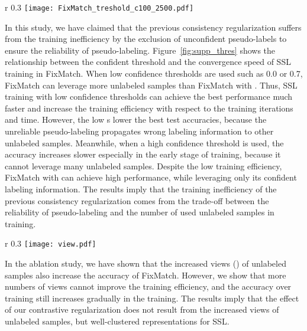 \documentclass[letterpaper]{article} \usepackage{aaai22}  \usepackage{times}  \usepackage{helvet}  \usepackage{courier}  \usepackage[hyphens]{url}  \usepackage{graphicx} \urlstyle{rm} \def\UrlFont{\rm}  \usepackage{natbib}  \usepackage{caption} \DeclareCaptionStyle{ruled}{labelfont=normalfont,labelsep=colon,strut=off} \frenchspacing  \setlength{\pdfpagewidth}{8.5in}  \setlength{\pdfpageheight}{11in}  \usepackage{algorithm}
\begin{document}
\begin{wrapfigure}{r} {0.3\textwidth}
\centering
\texttt{[image: FixMatch\_treshold\_c100\_2500.pdf]}
\caption{Test accuracy of FixMatch with different confident thresholds views over training.}
\label{fig:supp_thres}
\end{wrapfigure}


In this study, we have claimed that the previous consistency regularization suffers from the training inefficiency by the exclusion of unconfident pseudo-labels to ensure the reliability of pseudo-labeling.
Figure~\ref{fig:supp_thres} shows the relationship between the confident threshold  and the convergence speed of SSL training in FixMatch.
When low confidence thresholds are used such as 0.0 or 0.7, FixMatch can leverage more unlabeled samples than FixMatch with .
Thus, SSL training with low confidence thresholds can achieve the best performance much faster and increase the training efficiency with respect to the training iterations and time.
However, the low s lower the best test accuracies, because the unreliable pseudo-labeling propagates wrong labeling information to other unlabeled samples.
Meanwhile, when a high confidence threshold is used, the accuracy increases slower especially in the early stage of training, because it cannot leverage many unlabeled samples.
Despite the low training efficiency, FixMatch with  can achieve high performance, while leveraging only its confident labeling information.
The results imply that the training inefficiency of the previous consistency regularization comes from the trade-off between the reliability of pseudo-labeling and the number of used unlabeled samples in training.

\begin{wrapfigure}{r} {0.3\textwidth}
\centering
\texttt{[image: view.pdf]}
\caption{Test accuracy of FixMatch with different views over training.}
\label{fig:supp_view}
\end{wrapfigure}

In the ablation study, we have shown that the increased views () of unlabeled samples also increase the accuracy of FixMatch.
However, we show that more numbers of views cannot improve the training efficiency, and the accuracy over training still increases gradually in the training.
The results imply that the effect of our contrastive regularization does not result from the increased views of unlabeled samples, but well-clustered representations for SSL.
\end{document}
